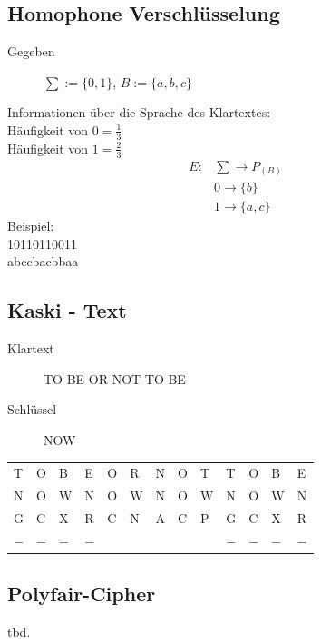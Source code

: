 \documentclass[10pt]{article}
\newcommand{\ra}{\rightarrow}
\begin{document}
\subsection{Homophone Verschlüsselung}
\begin{description}
	\item[Gegeben] $\sum := \{0,1\}$, $B:=\{a,b,c\}$
\end{description}
Informationen über die Sprache des Klartextes: \\
Häufigkeit von $0=\frac{1}{3}$ \\
Häufigkeit von $1=\frac{2}{3}$
\begin{align}
	E: & \sum \ra P_{(B)} \\
	& 0 \ra \{b\} \\
	& 1 \ra \{a,c\}
\end{align}
Beispiel: \\
10110110011 \\
abccbacbbaa

\subsection{Kaski - Text}
\begin{description}
	\item[Klartext] TO BE OR NOT TO BE
	\item[Schlüssel] NOW
\end{description}

\begin{tabular}{l l l | l l l | l l l | l l l | l }
	T & O & B & E & O & R & N & O & T & T & O & B & E \\ 
	N & O & W & N & O & W & N & O & W & N & O & W & N \\
	G & C & X & R & C & N & A & C & P & G & C & X & R \\
	$-$ & $-$ & $-$ & $-$ & & & & & & $-$ & $-$ & $-$ & $-$ \\
\end{tabular}

\subsection{Polyfair-Cipher}
tbd.
\end{document}
